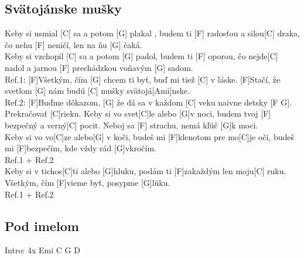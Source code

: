 \documentclass[10pt]{article}
\begin{document}
\begin{Large}
\begin{minipage}{\textwidth}
\subsection{Svätojánske mušky}
\begin{multicols}{2}
\begin{guitar}
	Keby si usmial [C] sa a potom [G] plakal ,
	budem ti [F] radosťou a silou[C] draka,
	čo nehu [F] neničí, len na ňu [G] čaká.
	\\
	Keby si vzchopil [C] sa a potom [G] padol,
	budem ti [F] oporou, čo nejde[C] nadol
	a jarnou [F] prechádzkou voňavým [G] sadom.
	\\
	Ref.1:
	[F]Všetkým, čím [G] chcem ti byť,
	buď mi tiež [C] v láske.
	[F]Stačí, že svetlom [G] nám
	budú [C] mušky svätojá[Ami]nske.
	\\
	Ref.2:
	[F]Buďme dôkazom, [G] že dá sa
	v každom [C] veku
	naivne detsky [F G].
	Prekračovať [C]rieku.
	\columnbreak
	Keby si vo svet[C]le alebo [G]v noci,
	budem tvoj [F] bezpečný a verný[C] pocit.
	Neboj sa [F] strachu, nemá kľúč [G]k moci.
	\\
	Keby si vo vo[C]ze alebo[G] v koči,
	budeš mi [F]klenotom pre mo[C]je oči,
	budeš mi [F]bezpečím, kde vždy rád [G]vkročím.
	\\
	Ref.1 + Ref.2
	\\
	Keby si v tichos[C]ti alebo [G]hluku,
	podám ti [F]zakaždým len moju[C] ruku.
	Všetkým, čím [F]vieme byť, posypme [G]lúku.
	\\
	Ref.1 + Ref.2
\end{guitar}
\end{multicols}
\end{minipage}

\begin{minipage}{\textwidth}
\subsection{Pod imelom}
\begin{multicols*}{2}
\begin{guitar}
	Intro: 4x Emi C G D
	

\end{guitar}
\end{multicols*}
\end{minipage}
\end{Large}
\end{document}
